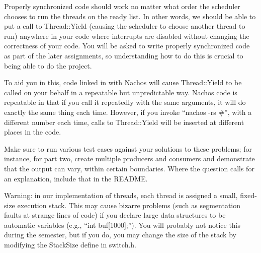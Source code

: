 Properly synchronized code should work no matter what order the 
scheduler chooses to run the threads on the ready list.  In other 
words, we should be able to put a call to Thread::Yield (causing the scheduler
to choose another thread to run) anywhere in your code where interrupts 
are disabled without changing the correctness of your code.   
You will be asked to write properly synchronized code as part of the 
later assignments, so understanding how to do this is crucial to
being able to do the project.

To aid you in this, code linked in with Nachos will cause Thread::Yield 
to be called on your behalf in a repeatable but unpredictable way.
Nachos code is repeatable in that if you call it repeatedly with the 
same arguments, it will do exactly the same thing each time.
However, if you invoke ``nachos -rs \#'', with a different number each
time, calls to Thread::Yield will be inserted at different places in the code.

Make sure to run various test cases against your solutions to 
these problems; for instance, for part two, create multiple producers
and consumers and demonstrate that the output can vary, within certain 
boundaries.  Where the question calls for an explanation, include
that in the README.

Warning: in our implementation of threads, each thread is assigned a 
small, fixed-size execution stack.  This may cause bizarre problems 
(such as segmentation faults at strange lines of code) if you declare 
large data structures to be automatic variables (e.g., ``int buf[1000];'').
You will probably not notice this during the semester, but if you do,
you may change the size of the stack by modifying the StackSize define in 
switch.h.

